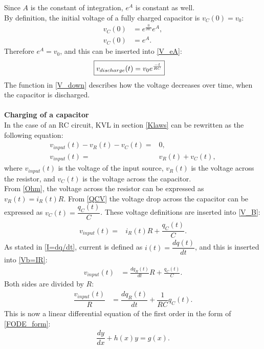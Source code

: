 Since $A$ is the constant of integration, $e^A$ is constant as well.
\\
By definition, the initial voltage of a fully charged capacitor is $v_C(0)=v_0$:
 \begin{align*}
	v_C(0) &= e^{\frac{0}{RC}}e^A, \\
	v_C(0) &= e^A.
 \end{align*}
Therefore $e^A = v_0$, and this can be inserted into \eqref{V_eA}:
\begin{align}
\label{V_down}
\Aboxed{
 v_{discharge}(t) = v_0e^{\frac{-t}{RC}}
 }
\end{align}
The function in \eqref{V_down} describes how the voltage decreases over time, when the capacitor is discharged.
\\
\\
\textbf{Charging of a capacitor}\\
In the case of an RC circuit, KVL in section \ref{Klaws} can be rewritten as the following equation:
\begin{align}
v_{input}(t)-v_R(t)-v_C(t) =& 0, \nonumber \\
v_{input}(t) =& v_R(t)+v_C(t), \label{V_B}
\end{align}
where $v_{input}(t)$ is the voltage of the input source, $v_R(t)$ is the voltage across the resistor, and $v_C(t)$ is the voltage across the capacitor. 
\\
From \eqref{Ohm}, the voltage across the resistor can be expressed as $v_R(t)=i_{R}(t) R$. From \eqref{QCV} the voltage drop across the capacitor can be expressed as $v_C(t)=\dfrac{q_C (t)}{C}$. These voltage definitions are inserted into \eqref{V_B}:
\begin{align}
v_{input}(t) =& i_{R}(t) R + \dfrac{q_C (t)}{C}. \label{Vb=IR}
\end{align}
As stated in \eqref{I=dq/dt}, current is defined as $i(t) =\dfrac{dq(t)}{dt}$, and this is inserted into \eqref{Vb=IR}:
 \begin{align*}
 	v_{input}(t) &= \frac{dq_R(t)}{dt} R + \frac{q_C (t)}{C}.
 \end{align*}
Both sides are divided by $R$:
\begin{align}
\dfrac{v_{input}(t)}{R} &= \dfrac{dq_R(t)}{dt} + \dfrac{1}{RC}q_C(t).\label{Vb/R} 
\end{align}
This is now a linear differential equation of the first order in the form of \eqref{FODE_form}:
\begin{align*}
\dfrac{dy}{dx}+h(x)y=g(x).
\end{align*}
